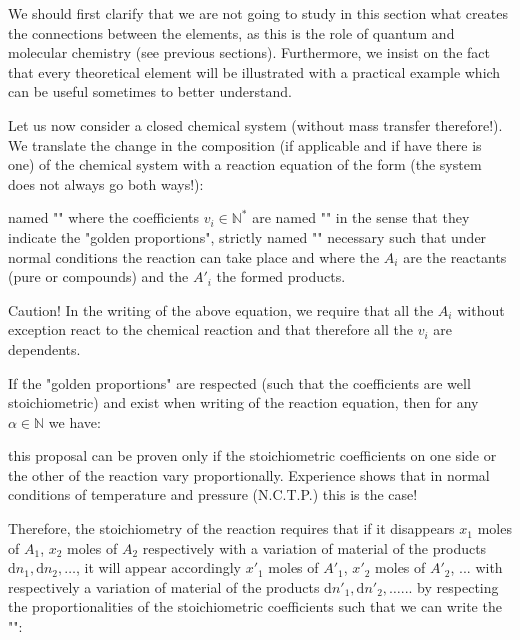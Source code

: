 	We should first clarify that we are not going to study in this section what creates the connections between the elements, as this is the role of quantum and molecular chemistry (see previous sections). Furthermore, we insist on the fact that every theoretical element will be illustrated with a practical example which can be useful sometimes to better understand.
	
	Let us now consider a closed chemical system (without mass transfer therefore!). We translate the change in the composition (if applicable and if have there is one) of the chemical system with a reaction equation of the form (the system does not always go both ways!):
	
	named "" where the coefficients $v_i \in \mathbb{N}^*$ are named  "" in the sense that they indicate the "golden proportions", strictly named "" necessary such that under normal conditions the reaction can take place and where the $A_i$ are the reactants (pure or compounds) and the ${A'}_i$ the formed products.
	
	Caution! In the writing of the above equation, we require that all the $A_i$ without exception react to the chemical reaction and that therefore all the $v_i$ are dependents.
	
	If the "golden proportions" are respected (such that the coefficients are well stoichiometric) and exist when writing of the reaction equation, then for any $\alpha \in \mathbb{N}$ we have:
	
	this proposal can be proven only if the stoichiometric coefficients on one side or the other of the reaction vary proportionally. Experience shows that in normal conditions of temperature and pressure (N.C.T.P.) this is the case!
	
	Therefore, the stoichiometry of the reaction requires that if it disappears $x_1$ moles of $A_1$, $x_2$ moles of $A_2$  respectively with a variation of material of the products $\mathrm{d}n_1,\mathrm{d}n_2,\ldots $, it will appear accordingly ${x'}_1$ moles of ${A'}_1$, ${x'}_2$ moles of ${A'}_2$, ... with respectively a variation of material of the products $\mathrm{d}{n'}_1,\mathrm{d}{n'}_2,\ldots $... by respecting the proportionalities of the stoichiometric coefficients such that we can write the "":
	
